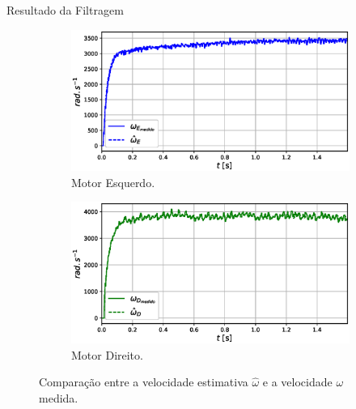 \begin{frame}{Resultado da Filtragem}

    \begin{figure}
        \begin{subfigure}{.45\textwidth}
            \centering
            \includegraphics[width=\textwidth]{figuras/resultados/exp04/filtro_vs_sem_filtro_esquerdo100.eps}
            \caption{Motor Esquerdo.}
        \end{subfigure}
        \begin{subfigure}{.45\textwidth}
            \centering
            \includegraphics[width=\textwidth]{figuras/resultados/exp04/filtro_vs_sem_filtro_direito100.eps}
            \caption{Motor Direito.}
        \end{subfigure}
        \caption{Comparação entre a velocidade estimativa $\hat{\omega}$ e a velocidade $\omega$ medida.}
    \end{figure}
    
\end{frame}

